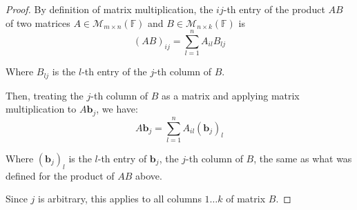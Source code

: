 \documentclass[12pt, a4paper]{article}
\newcommand{\F}{\mathbb{F}}
\begin{document}
\begin{proof}
    By definition of matrix multiplication, the $ij$-th entry of the
    product $AB$ of two matrices $A \in \mathcal{M}_{m \times n}(\F)$ and
    $B \in \mathcal{M}_{n \times k}(\F)$ is
    \[
        (AB)_{ij} = \sum_{l = 1}^{n} A_{il}B_{lj}
    \]
    
    Where $B_{lj}$ is the $l$-th entry of the $j$-th column of $B$.

    Then, treating the $j$-th column of $B$ as a matrix and applying
    matrix multiplication to $A\mathbf{b}_j$, we have:
    \[
        A\mathbf{b}_j = \sum_{l = 1}^{n} A_{il}(\mathbf{b}_j)_l
    \]

    Where $(\mathbf{b}_j)_l$ is the $l$-th entry of $\mathbf{b}_j$,
    the $j$-th column of $B$, the same as what was defined for the
    product of $AB$ above.

    Since $j$ is arbitrary, this applies to all columns $1 \ldots k$
    of matrix $B$.
\end{proof}
\end{document}

